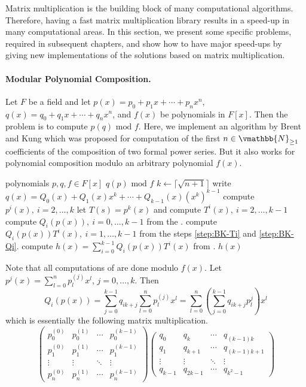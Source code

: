 Matrix multiplication is the building block of many computational algorithms. Therefore, having a 
fast matrix multiplication library results in a speed-up in many computational areas. In this 
section, we present some specific problems, required in subsequent chapters, and show how to have 
major speed-ups by giving new implementations of the solutions based on matrix multiplication.

\paragraph{Modular Polynomial Composition.}
Let $F$ be a field and let $p(x) = p_0 + p_1x + \cdots + p_nx^n$, $q(x) = q_0 + q_1x + \cdots + 
q_nx^n$, and $f(x)$ be polynomials in $F[x]$. Then the problem is to compute $p(q) \text{ mod } f$. 
Here, we implement an algorithm by Brent and Kung \cite{BreKun1978} which was proposed for 
computation of the first $n \in \vmathbb{N}_{\ge 1}$ coefficients of the composition of two formal 
power series. But it also works for polynomial composition modulo an arbitrary polynomial $f(x)$.
\begin{algorithm}
\label{algorithm:polyComp}
\begin{algorithmic}[1]
\REQUIRE  polynomials $p, q, f \in F[x]$
\ENSURE  $q(p) \text{ mod } f$
\STATE $k \leftarrow \lceil \sqrt{n + 1} \rceil$
\STATE write $q(x) = Q_0(x) + Q_1(x)x^k + \cdots + Q_{k - 1}(x)(x^k)^{k - 1}$
\STATE compute $p^i(x), \: i = 2, \dots, k$
\label{step:BK-pi}
\STATE let $T(s) = p^k(x)$ and compute $T^i(x), \: i = 2, \dots, k - 1$
\label{step:BK-Ti}
\STATE compute $Q_i(p(x)), \: i = 0, \dots, k - 1$ from the .
\label{step:BK-Qi}
\STATE compute $Q_i(p(x))T^i(x), \: i = 1, \dots, k - 1$ from the steps \ref{step:BK-Ti} and 
\ref{step:BK-Qi}.
\label{step:BK-QiTi}
\STATE compute $h(x) = \sum_{i = 0}^{k - 1} Q_i(p(x))T^i(x)$ from .
\RETURN $h(x)$
\end{algorithmic}
\end{algorithm}
Note that all computations of  are done modulo $f(x)$. Let $p^j(x) 
= \sum_{l = 0}^n p_l^{(j)}x^l$, $j = 0, \dots, k$. Then 
$$
Q_i(p(x)) = \sum_{j = 0}^{k - 1} q_{ik + j} \sum_{l = 0}^n p_l^{(j)}x^l = \sum_{l = 0}^n \left(  
\sum_{j = 0}^{k - 1} q_{ik + j}p_l^j\right)x^l
$$
which is essentially the following matrix multiplication.
\[
 \begin{pmatrix}
  p_0^{(0)} & p_0^{(1)} & \cdots & p_0^{(k - 1)} \\
  p_1^{(0)} & p_1^{(1)} & \cdots & p_1^{(k - 1)} \\
  \vdots  & \vdots  & \ddots & \vdots  \\
  p_n^{(0)} & p_n^{(1)} & \cdots & p_n^{(k - 1)}
 \end{pmatrix}
 \begin{pmatrix}
  q_0 & q_k & \cdots & q_{(k - 1)k} \\
  q_1 & q_{k + 1} & \cdots & q_{(k - 1)k + 1} \\
  \vdots  & \vdots  & \ddots & \vdots  \\
  q_{k - 1} & q_{2k - 1} & \cdots & q_{k^2 - 1}
 \end{pmatrix}
\]

